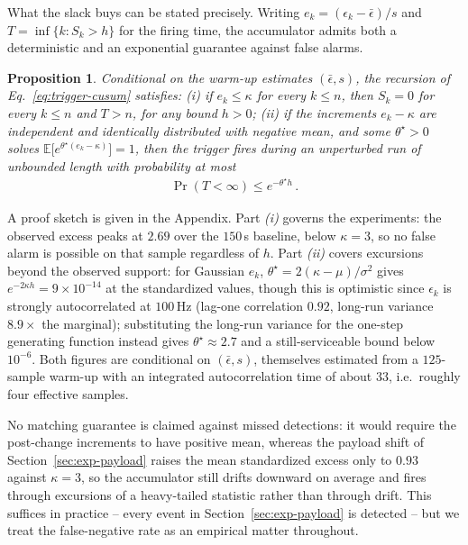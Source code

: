 \documentclass[letterpaper, 10 pt, conference]{ieeeconf}  %
\newtheorem{proposition}{Proposition}
\newcommand{\E}{\mathbb{E}}
\begin{document}
What the slack buys can be stated precisely.
Writing $e_k = (\epsilon_k - \bar{\epsilon})/s$ and $T = \inf\{k : S_k > h\}$ for the firing time, the accumulator admits both a deterministic and an exponential guarantee against false alarms.

\begin{proposition} \label{prop:fpr}
Conditional on the warm-up estimates $(\bar{\epsilon}, s)$, the recursion of Eq.~\ref{eq:trigger-cusum} satisfies:
\emph{(i)} if $e_k \leq \kappa$ for every $k \leq n$, then $S_k = 0$ for every $k \leq n$ and $T > n$, for any bound $h > 0$;
\emph{(ii)} if the increments $e_k - \kappa$ are independent and identically distributed with negative mean, and some $\theta^{\star} > 0$ solves $\E\big[e^{\theta^{\star}(e_k - \kappa)}\big] = 1$, then the trigger fires during an unperturbed run of unbounded length with probability at most
\begin{align} \label{eq:lundberg}
    \Pr(T < \infty) \leq e^{-\theta^{\star} h} \,.
\end{align}
\end{proposition}

A proof sketch is given in the Appendix.
Part \emph{(i)} governs the experiments: the observed excess peaks at $2.69$ over the $150$\,s baseline, below $\kappa=3$, so no false alarm is possible on that sample regardless of $h$.
Part \emph{(ii)} covers excursions beyond the observed support: for Gaussian $e_k$, $\theta^\star = 2(\kappa-\mu)/\sigma^2$ gives $e^{-2\kappa h} = 9\times10^{-14}$ at the standardized values, though this is optimistic since $\epsilon_k$ is strongly autocorrelated at $100$\,Hz (lag-one correlation $0.92$, long-run variance $8.9\times$ the marginal); substituting the long-run variance for the one-step generating function instead gives $\theta^\star \approx 2.7$ and a still-serviceable bound below $10^{-6}$.
Both figures are conditional on $(\bar\epsilon,s)$, themselves estimated from a $125$-sample warm-up with an integrated autocorrelation time of about $33$, i.e.\ roughly four effective samples.

No matching guarantee is claimed against missed detections: it would require the post-change increments to have positive mean, whereas the payload shift of Section~\ref{sec:exp-payload} raises the mean standardized excess only to $0.93$ against $\kappa=3$, so the accumulator still drifts downward on average and fires through excursions of a heavy-tailed statistic rather than through drift.
This suffices in practice -- every event in Section~\ref{sec:exp-payload} is detected -- but we treat the false-negative rate as an empirical matter throughout.
\end{document}
